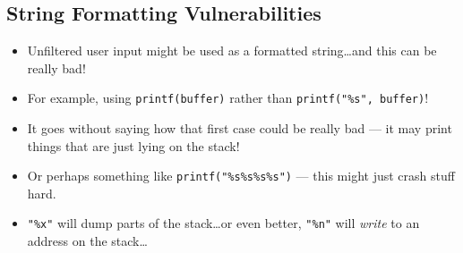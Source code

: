 \documentclass{article}
\begin{document}
\subsection{String Formatting Vulnerabilities}
\begin{itemize}
    \item Unfiltered user input might be used as a formatted string\dots and this can be really bad!
    \item For example, using \lstinline{printf(buffer)} rather than \lstinline{printf("%s", buffer)}!
    \item It goes without saying how that first case could be really bad --- it may print things that are just lying on the stack!
    \item Or perhaps something like \lstinline{printf("%s%s%s%s")} --- this might just crash stuff hard.
    \item \lstinline{"%x"} will dump parts of the stack\dots or even better, \lstinline{"%n"} will \emph{write} to an address on the stack\dots
\end{itemize}
\end{document}
